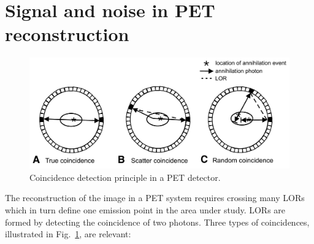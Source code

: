 \documentclass[review]{elsarticle}
\begin{document}
\section{Signal and noise in PET reconstruction}
\label{sec.signalAndNoise}

\begin{figure}[!bthp]
	\centering
	\includegraphics[scale=0.25]{../img/pet_coincidences.png}
	\caption{\label{fig.coi} Coincidence detection principle in a PET detector.}
\end{figure}

The reconstruction of the image in a PET system requires crossing many LORs which in turn define one emission point in the area under study. LORs are formed by detecting the coincidence of two photons. Three types of coincidences, illustrated in Fig.~\ref{fig.coi}, are relevant:
\end{document}
